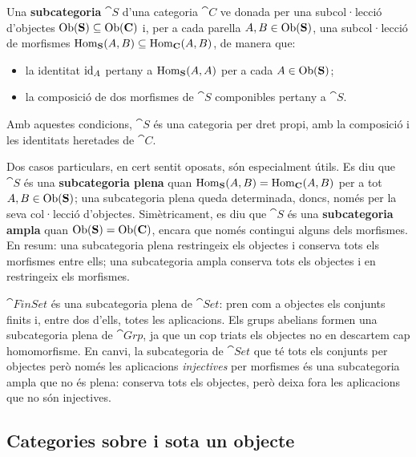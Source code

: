 \begin{definicio}
Una \textbf{subcategoria} $\cat{S}$ d'una categoria $\cat{C}$ ve donada per una subcol·lecció d'objectes $\operatorname{Ob}(\mathbf{S})\subseteq\operatorname{Ob}(\mathbf{C})$ i, per a cada parella $A,B\in\operatorname{Ob}(\mathbf{S})$, una subcol·lecció de morfismes $\operatorname{Hom}_{\mathbf{S}}(A,B)\subseteq\operatorname{Hom}_{\mathbf{C}}(A,B)$, de manera que:
\begin{itemize}
\item la identitat $\operatorname{id}_A$ pertany a $\operatorname{Hom}_{\mathbf{S}}(A,A)$ per a cada $A\in\operatorname{Ob}(\mathbf{S})$;
\item la composició de dos morfismes de $\cat{S}$ componibles pertany a $\cat{S}$.
\end{itemize}
Amb aquestes condicions, $\cat{S}$ és una categoria per dret propi, amb la composició i les identitats heretades de $\cat{C}$.
\end{definicio}

Dos casos particulars, en cert sentit oposats, són especialment útils. Es diu que $\cat{S}$ és una \textbf{subcategoria plena} quan $\operatorname{Hom}_{\mathbf{S}}(A,B)=\operatorname{Hom}_{\mathbf{C}}(A,B)$ per a tot $A,B\in\operatorname{Ob}(\mathbf{S})$; una subcategoria plena queda determinada, doncs, només per la seva col·lecció d'objectes. Simètricament, es diu que $\cat{S}$ és una \textbf{subcategoria ampla} quan $\operatorname{Ob}(\mathbf{S})=\operatorname{Ob}(\mathbf{C})$, encara que només contingui alguns dels morfismes. En resum: una subcategoria plena restringeix els objectes i conserva tots els morfismes entre ells; una subcategoria ampla conserva tots els objectes i en restringeix els morfismes.

\begin{exemple}
$\cat{FinSet}$ és una subcategoria plena de $\cat{Set}$: pren com a objectes els conjunts finits i, entre dos d'ells, totes les aplicacions. Els grups abelians formen una subcategoria plena de $\cat{Grp}$, ja que un cop triats els objectes no en descartem cap homomorfisme. En canvi, la subcategoria de $\cat{Set}$ que té tots els conjunts per objectes però només les aplicacions \emph{injectives} per morfismes és una subcategoria ampla que no és plena: conserva tots els objectes, però deixa fora les aplicacions que no són injectives.
\end{exemple}

\subsection{Categories sobre i sota un objecte}

